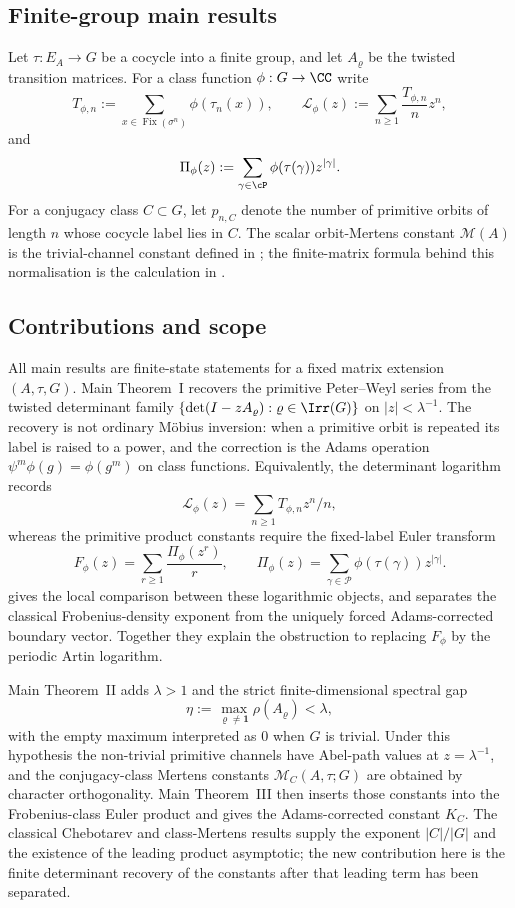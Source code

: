 \subsection{Finite-group main results}

Let \(\tau:E_A\to G\) be a cocycle into a finite group, and let
\(A_\varrho\) be the twisted transition matrices. For a class function
\(\phi:G\to\CC\) write
\[
  T_{\phi,n}:=\sum_{x\in\operatorname{Fix}(\sigma^n)}
    \phi(\tau_n(x)),
  \qquad
  \mathcal L_\phi(z):=\sum_{n\ge 1}\frac{T_{\phi,n}}{n}z^n,
\]
and
\[
  \Pi_\phi(z):=\sum_{\gamma\in\cP}\phi(\tau(\gamma))z^{|\gamma|}.
\]
For a conjugacy class \(C\subset G\), let \(p_{n,C}\) denote the number
of primitive orbits of length \(n\) whose cocycle label lies in \(C\).
The scalar orbit-Mertens constant \(\mathcal M(A)\) is the
trivial-channel constant defined in ; the
  finite-matrix formula behind this normalisation is the calculation in
  .

\subsection{Contributions and scope}\label{sec:intro-scope-of-results}

All main results are finite-state statements for a fixed matrix extension
\((A,\tau,G)\).  Main Theorem~I recovers the primitive Peter--Weyl series
from the twisted determinant family
\(\{\det(I-zA_\varrho):\varrho\in\Irr(G)\}\) on
\(|z|<\lambda^{-1}\).  The recovery is not ordinary M\"obius inversion:
when a primitive orbit is repeated its label is raised to a power, and the
correction is the Adams operation \(\psi^m\phi(g)=\phi(g^m)\) on class
functions.  Equivalently, the determinant logarithm records
\[
  \mathcal L_\phi(z)=\sum_{n\ge1}T_{\phi,n}z^n/n,
\]
whereas the primitive product constants require the fixed-label Euler
transform
\[
  F_\phi(z)=\sum_{r\ge1}\frac{\Pi_\phi(z^r)}{r},
  \qquad
  \Pi_\phi(z)=\sum_{\gamma\in\mathcal P}
       \phi(\tau(\gamma))z^{|\gamma|}.
\]
 gives the local comparison
between these logarithmic objects, and 
separates the classical Frobenius-density exponent from the uniquely forced
Adams-corrected boundary vector.  Together they explain the obstruction to
replacing \(F_\phi\) by the periodic Artin logarithm.

Main Theorem~II adds \(\lambda>1\) and the strict finite-dimensional
spectral gap
\[
  \eta:=\max_{\varrho\ne\mathbf1}\rho(A_\varrho)<\lambda,
\]
with the empty maximum interpreted as \(0\) when \(G\) is trivial.  Under
this hypothesis the non-trivial primitive channels have Abel-path values at
\(z=\lambda^{-1}\), and the conjugacy-class Mertens constants
\(\mathcal M_C(A,\tau;G)\) are obtained by character orthogonality.
Main Theorem~III then inserts those constants into the Frobenius-class Euler
product and gives the Adams-corrected constant \(K_C\).  The classical
Chebotarev and class-Mertens results supply the exponent \(|C|/|G|\) and the
existence of the leading product asymptotic; the new contribution here is
the finite determinant recovery of the constants after that leading term has
been separated.

